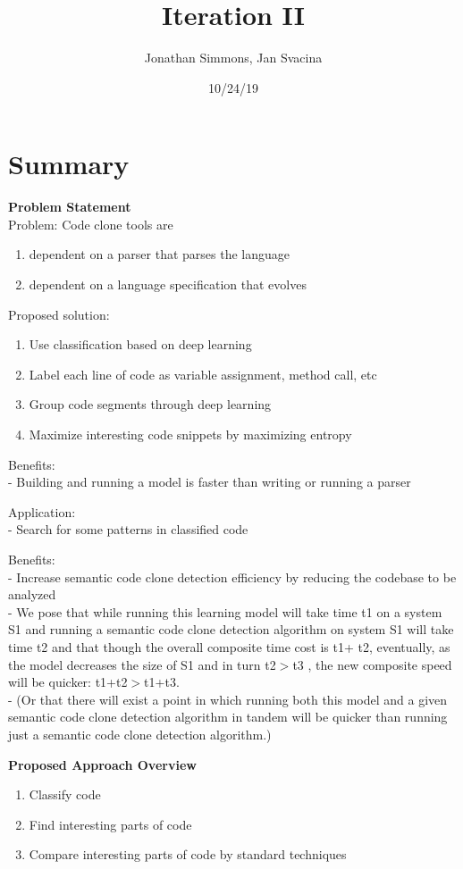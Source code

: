 \documentclass{article}
\title{Iteration II}
\date{10/24/19}
\author{Jonathan Simmons, Jan Svacina}
\begin{document}
    \maketitle
    \section{Summary}
    \textbf{Problem Statement}\\
    Problem: Code clone tools are
    \begin{enumerate}
        \item dependent on a parser that parses the language
        \item dependent on a language specification that evolves
    \end{enumerate}
    Proposed solution:
    \begin{enumerate}
        \item Use classification based on deep learning
        \item Label each line of code as variable assignment, method call, etc
        \item Group code segments through deep learning
        \item Maximize interesting code snippets by maximizing entropy
    \end{enumerate}
    Benefits:\\
    - Building and running a model is faster than writing or running a parser

    Application:\\
    - Search for some patterns in classified code

    Benefits:\\
    - Increase semantic code clone detection efficiency by reducing the codebase to be analyzed \\
    - We pose that while running this learning model will take time t1 on a system S1 and running a semantic code clone detection algorithm on system S1 will take time t2 and that though the overall composite time cost is t1+ t2, eventually, as the model decreases the size of S1 and in turn t2$>$t3 , the new composite speed will be quicker: t1+t2$>$t1+t3.\\
    - (Or that there will exist a point in which running both this model and a given semantic code clone detection algorithm in tandem will be quicker than running just a semantic code clone detection algorithm.)

    \textbf{Proposed Approach Overview}
    \begin{enumerate}
        \item Classify code
        \item Find interesting parts of code
        \item Compare interesting parts of code by standard techniques
    \end{enumerate}
\end{document}

